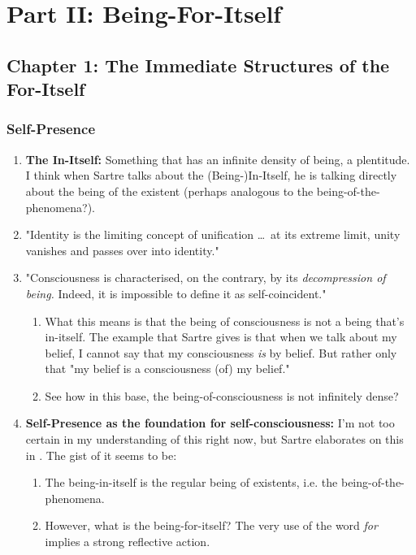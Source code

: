 \section{Part II: Being-For-Itself}

\subsection{Chapter 1: The Immediate Structures of the For-Itself}

\subsubsection{Self-Presence}

\begin{enumerate}
  \item \textbf{The In-Itself:} Something that has an infinite density of being, a plentitude. I think when Sartre talks about the (Being-)In-Itself, he is talking directly about the being of the existent (perhaps analogous to the being-of-the-phenomena?).
  \item "Identity is the limiting concept of unification \ldots\ at its extreme limit, unity vanishes and passes over into identity." \autocite[123]{sartre}
  \item "Consciousness is characterised, on the contrary, by its \emph{decompression of being.} Indeed, it is impossible to define it as self-coincident." \autocite[123]{sartre}
  \begin{enumerate}
    \item What this means is that the being of consciousness is not a being that's in-itself. The example that Sartre gives is that when we talk about my belief, I cannot say that my consciousness \emph{is} by belief. But rather only that "my belief is a consciousness (of) my belief." \autocite[123]{sartre}
    \item See how in this base, the being-of-consciousness is not infinitely dense?
  \end{enumerate}
  \item \textbf{Self-Presence as the foundation for self-consciousness:} I'm not too certain in my understanding of this right now, but Sartre elaborates on this in \autocite[126]{sartre}. The gist of it seems to be:
  \begin{enumerate}
    \item The being-in-itself is the regular being of existents, i.e. the being-of-the-phenomena.
    \item However, what is the being-for-itself? The very use of the word \emph{for} implies a strong reflective action.

\end{enumerate}
\end{enumerate}
